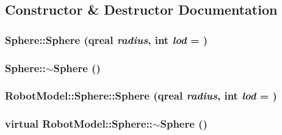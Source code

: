 \subsection{Constructor \& Destructor Documentation}
\hypertarget{class_robot_model_1_1_sphere_a9944239ac9fc56091f17701f547652da}{
\subsubsection[{Sphere}]{\setlength{\rightskip}{0pt plus 5cm}Sphere::Sphere (qreal {\em radius}, \/  int {\em lod} = {})}}
\label{class_robot_model_1_1_sphere_a9944239ac9fc56091f17701f547652da}
\hypertarget{class_robot_model_1_1_sphere_a569c071e50a3e11f678630ee1a17737e}{
\subsubsection[{$\sim$Sphere}]{\setlength{\rightskip}{0pt plus 5cm}Sphere::$\sim$Sphere ()}}
\label{class_robot_model_1_1_sphere_a569c071e50a3e11f678630ee1a17737e}
\hypertarget{class_robot_model_1_1_sphere_a0a673e3782cc9d061c0f421b2970b4a6}{
\subsubsection[{Sphere}]{\setlength{\rightskip}{0pt plus 5cm}RobotModel::Sphere::Sphere (qreal {\em radius}, \/  int {\em lod} = {})}}
\label{class_robot_model_1_1_sphere_a0a673e3782cc9d061c0f421b2970b4a6}
\hypertarget{class_robot_model_1_1_sphere_a19b5af03f0c3f6b28db4d741cbaf5c17}{
\subsubsection[{$\sim$Sphere}]{\setlength{\rightskip}{0pt plus 5cm}virtual RobotModel::Sphere::$\sim$Sphere ()}}
\label{class_robot_model_1_1_sphere_a19b5af03f0c3f6b28db4d741cbaf5c17}


